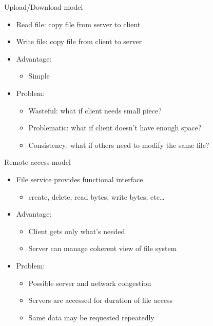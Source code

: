 \begin{slide}

	
	Upload/Download model
	\begin{itemize}
		\item Read file: copy file from server to client
		\item Write file: copy file from client to server
		\item Advantage: 
		\begin{itemize}
			\item Simple
		\end{itemize}
		\item Problem: 
		\begin{itemize}
			\item Wasteful: what if client needs small piece?
			\item Problematic: what if client doesn’t have enough space?
			\item Consistency: what if others need to modify the same file?
		\end{itemize}
	\end{itemize}

\end{slide}

\begin{slide}

	
	Remote access model
	\begin{itemize}
		\item File service provides functional interface
		\begin{itemize}
			\item create, delete, read bytes, write bytes, etc…
		\end{itemize}
		\item Advantage: 
		\begin{itemize}
			\item Client gets only what’s needed
			\item Server can manage coherent view of file system
		\end{itemize}
		\item Problem: 
		\begin{itemize}
			\item Possible server and network congestion
			\item Servers are accessed for duration of file access
			\item Same data may be requested repeatedly
		\end{itemize}
	\end{itemize}

\end{slide}

